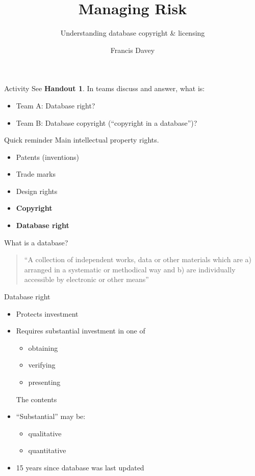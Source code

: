 \documentclass[aspectratio=169,14pt]{beamer}
\begin{document}
\title{Managing Risk}
\subtitle{Understanding database copyright \& licensing}
\author{Francis Davey}

\begin{frame}[b]
  \titlepage
\end{frame}
\begin{frame}{Activity}
See {\bf Handout 1}. In teams discuss and answer, what is:
  \begin{itemize}
  \item Team A: Database right?
  \item Team B: Database copyright (``copyright in a database'')?
  \end{itemize}
\end{frame}

\begin{frame}{Quick reminder}
Main intellectual property rights.
\begin{itemize}
\item Patents (inventions)
\item Trade marks 
\item Design rights
\item {\bf Copyright}
\item {\bf Database right}
\end{itemize}
\end{frame}

\begin{frame}{What is a database?}
  \begin{quote}
    ``A collection of independent works, data or other materials which are 
    a) arranged in a systematic or methodical way and 
    b) are individually accessible by electronic or other means''
  \end{quote}
\end{frame}

\begin{frame}{Database right}
  \begin{itemize}
  \item Protects investment
  \item Requires substantial investment in one of
    \begin{itemize}
    \item obtaining
    \item verifying
    \item presenting
    \end{itemize}
The contents
\item ``Substantial'' may be:
  \begin{itemize}
  \item qualitative
  \item quantitative
  \end{itemize}
\item 15 years since database was last updated
  \end{itemize}
\end{frame}
\end{document}
